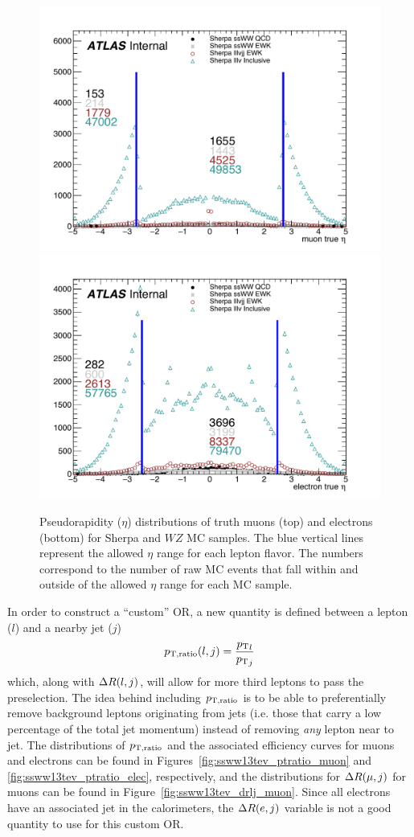 \begin{figure}[htbp]
  \centering
  \includegraphics[width=.48\textwidth]{figs/ssww_13tev/custom_or/ExtraMuonEta_counted}
  \includegraphics[width=.48\textwidth]{figs/ssww_13tev/custom_or/ExtraElecEta_counted}
  \caption{Pseudorapidity ($\eta$) distributions of truth muons (top) and electrons (bottom) for Sherpa \ssww and $WZ$ MC samples.  The blue vertical lines represent the allowed $\eta$ range for each lepton flavor.  The numbers correspond to the number of raw MC events that fall within and outside of the allowed $\eta$ range for each MC sample.}
  \label{fig:ssww13tev_wzveto_truthlepeta}
\end{figure}

In order to construct a ``custom'' OR, a new quantity is defined between a lepton ($l$) and a nearby jet ($j$)
\begin{equation}
  \ptratio(l,j) = \frac{{\pt}_l}{{\pt}_j}%
  \label{eq:ssww13tev_ptratio}
\end{equation}
which, along with $\Delta R(l,j)$, will allow for more third leptons to pass the preselection.
The idea behind including $p_{\textrm{T},\textrm{ratio}}$ is to be able to preferentially remove background leptons originating from jets (i.e. those that carry a low percentage of the total jet momentum) instead of removing \emph{any} lepton near to jet.
The distributions of $p_{\textrm{T},\textrm{ratio}}$ and the associated efficiency curves for muons and electrons can be found in Figures~\ref{fig:ssww13tev_ptratio_muon} and \ref{fig:ssww13tev_ptratio_elec}, respectively, and the distributions for $\Delta R(\mu,j)$ for muons can be found in Figure~\ref{fig:ssww13tev_drlj_muon}.
Since all electrons have an associated jet in the calorimeters, the $\Delta R(e,j)$ variable is not a good quantity to use for this custom OR.

